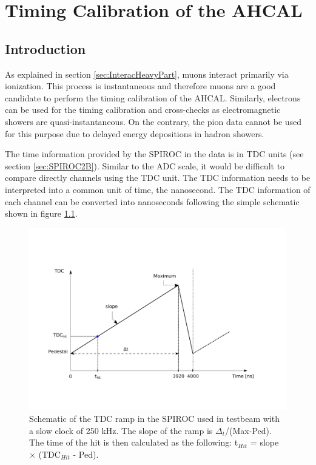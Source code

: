 \chapter{Timing Calibration of the AHCAL}
\label{chap:TimingCalib}

\section{Introduction}
\label{sec:TimingIntro}

As explained in section \ref{sec:InteracHeavyPart}, muons interact primarily via ionization. This process is instantaneous and therefore muons are a good candidate to perform the timing calibration of the AHCAL. Similarly, electrons can be used for the timing calibration and cross-checks as electromagnetic showers are quasi-instantaneous. On the contrary, the pion data cannot be used for this purpose due to delayed energy depositions in hadron showers.

The time information provided by the SPIROC in the data is in TDC units (see section \ref{sec:SPIROC2B}). Similar to the ADC scale, it would be difficult to compare directly channels using the TDC unit. The TDC information needs to be interpreted into a common unit of time, the nanosecond. The TDC information of each channel can be converted into nanoseconds following the simple schematic shown in figure \ref{fig:ConvertTime}.

\begin{figure}[htbp!]
  \centering
  \includegraphics[width=0.7\linewidth]{chap5/fig_AHCAL_Timing/Others/TDCRamp.pdf}
  \caption{Schematic of the TDC ramp in the SPIROC used in testbeam with a slow clock of 250 kHz. The slope of the ramp is $\Delta_t$/(Max-Ped). The time of the hit is then calculated as the following: t$_{Hit}$ = slope $\times$ (TDC$_{Hit}$ - Ped).} \label{fig:ConvertTime}
\end{figure}

